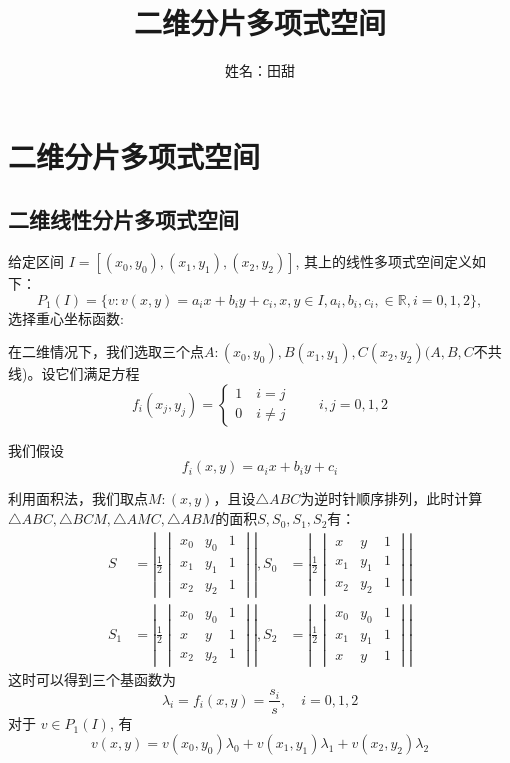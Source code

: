 \documentclass[12pt,a4paper]{article}
\title{二维分片多项式空间}
\author{姓名：田甜}
\date{\chntoday}
\begin{document}
\maketitle
\newpage
\section{二维分片多项式空间}
\subsection{二维线性分片多项式空间}
给定区间 $I = [(x_0,y_0), (x_1,y_1), (x_2,y_2)]$, 其上的线性多项式空间定义如下：
\begin{equation}
P_1(I) = \{v: v(x,y) = a_ix+b_iy+c_i, x,y\in I, a_i, b_i,c_i, \in \mathbb R,i=0,1,2\},
\end{equation}
选择重心坐标函数:

在二维情况下，我们选取三个点$A:(x_0,y_0),B(x_1,y_1),C(x_2,y_2)(A,B,C$不共线)。设它们满足方程\begin{equation}
f_i(x_j,y_j)=\begin{cases}1 \quad i=j
\\ 0\quad i\neq j\end{cases}\qquad i,j=0,1,2
\end{equation}

我们假设\begin{equation}
f_i(x,y)=a_ix+b_iy+c_i
\end{equation}

利用面积法，我们取点$M:(x,y)$，且设$\triangle ABC$为逆时针顺序排列，此时计算$\triangle ABC,\triangle BCM,\triangle AMC,\triangle ABM$的面积$S,S_0,S_1,S_2$有：
\begin{equation*}\begin{aligned}
		S&=\left| \frac{1}{2} \begin{vmatrix}
			x_0&y_0&1\\x_1&y_1&1\\x_2&y_2&1\end{vmatrix}\right|,S_0&=\left| \frac{1}{2} \begin{vmatrix}
			x&y&1\\x_1&y_1&1\\x_2&y_2&1\end{vmatrix}\right|\\
		S_1&=\left| \frac{1}{2} \begin{vmatrix}
			x_0&y_0&1\\x&y&1\\x_2&y_2&1\end{vmatrix}\right|,S_2&=\left| \frac{1}{2} \begin{vmatrix}
			x_0&y_0&1\\x_1&y_1&1\\x&y&1\end{vmatrix}\right|
	\end{aligned}
\end{equation*}
这时可以得到三个基函数为
\begin{equation}
\lambda_i=f_i(x,y)=\frac{s_i}{s},\quad i=0,1,2
\end{equation}
对于 $v \in P_1(I)$, 有
$$
v(x,y) = v(x_0,y_0)\lambda_0 + v(x_1,y_1) \lambda_1+ v(x_2,y_2) \lambda_2
$$
\end{document}
